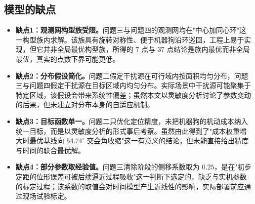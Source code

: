 \subsection{模型的缺点}
\begin{itemize}[itemindent=2em]
\item \textbf{缺点1：观测网构型族受限。}问题三与问题四的观测网均在"中心加同心环"这一构型族内求解。该族具有旋转对称性、便于机器狗沿环巡回，工程上易于实现，但它并非全局最优构型族，所得的 $7$ 点与 $37$ 点结论是族内最优而非全局最优，真实的点数下界可能更低。
\item \textbf{缺点2：分布假设简化。}问题二假定干扰源在可行域内按面积均匀分布，问题三与问题四假定干扰源在目标区域内均匀分布。实际场景中干扰源可能聚集于特定区域，该假设会带来系统性偏差；虽然本文以灵敏度分析讨论了参数变动的后果，但未建立对分布本身的自适应机制。
\item \textbf{缺点3：目标函数单一。}问题二只优化定位精度，未把机器狗的机动成本纳入统一目标，而是以灵敏度分析的形式事后考察。虽然由此得到了"成本权重增大时最优基线向 $54.74^\circ$ 交会角收缩"这一有意义的结论，但未能直接给出精度与时间的联合最优解。
\item \textbf{缺点4：部分参数取经验值。}问题三清除阶段的侧移系数取为 $0.25$，是在"初步定距的位形误差可被后续逼近过程吸收"这一判断下选定的，缺乏与实机参数的标定过程；该系数的取值会对时间模型产生近线性的影响，实际部署前应通过现场试验标定。
\end{itemize}

